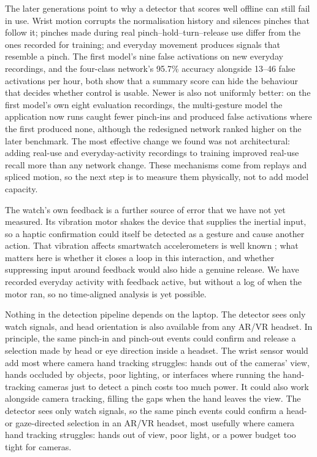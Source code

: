 \iffull
The later generations point to why a detector that scores well offline can still fail in use. Wrist motion corrupts the normalisation history and silences pinches that follow it; pinches made during real pinch--hold--turn--release use differ from the ones recorded for training; and everyday movement produces signals that resemble a pinch. The first model's nine false activations on new everyday recordings, and the four-class network's 95.7\% accuracy alongside 13--46 false activations per hour, both show that a summary score can hide the behaviour that decides whether control is usable. Newer is also not uniformly better: on the first model's own eight evaluation recordings, the multi-gesture model the application now runs caught fewer pinch-ins and produced false activations where the first produced none, although the redesigned network ranked higher on the later benchmark. The most effective change we found was not architectural: adding real-use and everyday-activity recordings to training improved real-use recall more than any network change. These mechanisms come from replays and spliced motion, so the next step is to measure them physically, not to add model capacity.

The watch's own feedback is a further source of error that we have not yet measured. Its vibration motor shakes the device that supplies the inertial input, so a haptic confirmation could itself be detected as a gesture and cause another action. That vibration affects smartwatch accelerometers is well known \cite{viband}; what matters here is whether it closes a loop in this interaction, and whether suppressing input around feedback would also hide a genuine release. We have recorded everyday activity with feedback active, but without a log of when the motor ran, so no time-aligned analysis is yet possible.
\fi

\label{prospects-for-ar-and-vr}

\iffull
Nothing in the detection pipeline depends on the laptop. The detector sees only watch signals, and head orientation is also available from any AR/VR headset. In principle, the same pinch-in and pinch-out events could confirm and release a selection made by head or eye direction inside a headset. The wrist sensor would add most where camera hand tracking struggles: hands out of the cameras' view, hands occluded by objects, poor lighting, or interfaces where running the hand-tracking cameras just to detect a pinch costs too much power. It could also work alongside camera tracking, filling the gaps when the hand leaves the view.
\else
The detector sees only watch signals, so the same pinch events could confirm a head- or gaze-directed selection in an AR/VR headset, most usefully where camera hand tracking struggles: hands out of view, poor light, or a power budget too tight for cameras.
\fi

